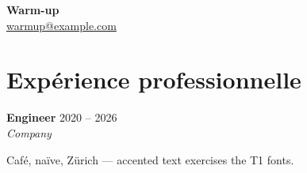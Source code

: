 \documentclass[10pt]{extarticle}
\newcommand{\role}[3]{%
  \textbf{#1} \hfill {\color{soft}\small #3}\\[-1pt]
  {\itshape\small #2}\par
}
\begin{document}
\begin{center}
    {\fontsize{18}{18}\selectfont\bfseries\color{accent} Warm-up}\\[3pt]
    {\footnotesize \href{mailto:warmup@example.com}{warmup@example.com}}
\end{center}

\section{Expérience professionnelle}

\role{Engineer}{Company}{2020 -- 2026}

\begin{tightlist}
    \item Café, naïve, Zürich — accented text exercises the T1 fonts.
\end{tightlist}
\end{document}
